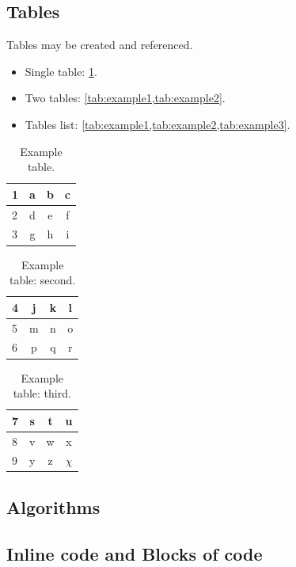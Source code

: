 \subsection{Tables}
Tables may be created and referenced.
\begin{itemize}
\item Single table: \cref{tab:example1}.
\item Two tables: \cref{tab:example1,tab:example2}.
\item Tables list: \cref{tab:example1,tab:example2,tab:example3}.
\end{itemize}

\begin{table} \caption{\label{tab:example1} Example table.}
\begin{tabular}{l | c c c} \hline
1 & a & b & c \\ \hline
2 & d & e & f \\ \hline
3 & g & h & i \\
\hline \end{tabular}
\end{table}

\begin{table} \caption{\label{tab:example2} Example table: second.}
\begin{tabular}{l | c c c} \hline
4 & j & k & l \\ \hline
5 & m & n & o \\ \hline
6 & p & q & r \\
\hline \end{tabular}
\end{table}

\begin{table} \caption{\label{tab:example3} Example table: third.}
\begin{tabular}{l | c c c} \hline
7 & s & t & u \\ \hline
8 & v & w & x \\ \hline
9 & y & z & $\chi$ \\
\hline \end{tabular}
\end{table}


\subsection{Algorithms}

\subsection{Inline code and Blocks of code}

